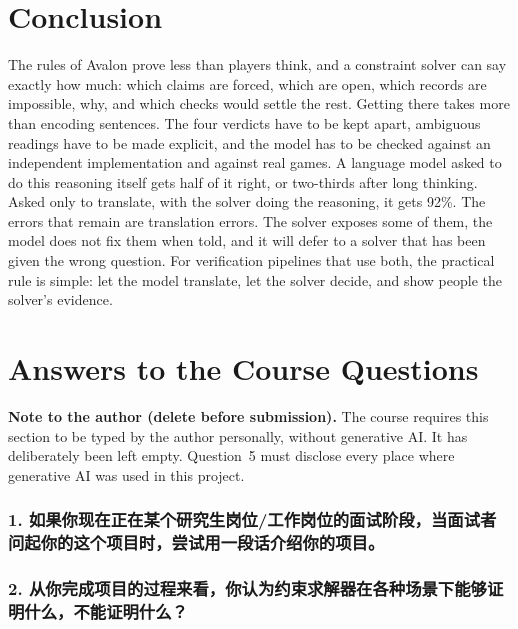 \documentclass[runningheads]{llncs}
\begin{document}
\section{Conclusion}
The rules of Avalon prove less than players think, and a constraint solver can say exactly how much: which claims
are forced, which are open, which records are impossible, why, and which checks would settle the rest. Getting
there takes more than encoding sentences. The four verdicts have to be kept apart, ambiguous readings have to be made
explicit, and the model has to be checked against an independent implementation and against real games.
A language model asked to do this reasoning itself gets half of it right, or two-thirds after long thinking. Asked
only to translate, with the solver doing the reasoning, it gets 92\%. The errors that remain are translation errors.
The solver exposes some of them, the model does not fix them when told, and it will defer to a solver that has been
given the wrong question. For verification pipelines that use both, the practical rule is simple: let the model
translate, let the solver decide, and show people the solver's evidence.




\clearpage
\appendix
\section{Answers to the Course Questions}\label{sec:questions}
\begin{tcolorbox}[colback=white, colframe=clay, boxrule=0.6pt, arc=2pt, fontupper=\small]
\textbf{Note to the author (delete before submission).} The course requires this section to be typed by the author
personally, without generative AI. It has deliberately been left empty. Question~5 must disclose every place where
generative AI was used in this project.
\end{tcolorbox}

\subsubsection*{1. 如果你现在正在某个研究生岗位/工作岗位的面试阶段，当面试者问起你的这个项目时，尝试用一段话介绍你的项目。}
\vspace{5em}
\subsubsection*{2. 从你完成项目的过程来看，你认为约束求解器在各种场景下能够证明什么，不能证明什么？}
\vspace{5em}
\end{document}
